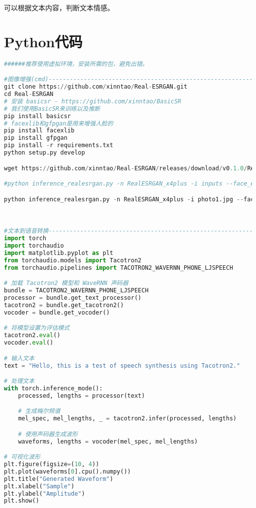 \documentclass{article}
\begin{document}
可以根据文本内容，判断文本情感。

\newpage
\section{Python代码}

\begin{lstlisting}[language=Python]
    ######推荐使用虚拟环境，安装所需的包，避免出错。

#图像增强(cmd)-------------------------------------------------------------------
git clone https://github.com/xinntao/Real-ESRGAN.git
cd Real-ESRGAN
# 安装 basicsr - https://github.com/xinntao/BasicSR
# 我们使用BasicSR来训练以及推断
pip install basicsr
# facexlib和gfpgan是用来增强人脸的
pip install facexlib
pip install gfpgan
pip install -r requirements.txt
python setup.py develop

wget https://github.com/xinntao/Real-ESRGAN/releases/download/v0.1.0/RealESRGAN_x4plus.pth -P weights

#python inference_realesrgan.py -n RealESRGAN_x4plus -i inputs --face_enhance

python inference_realesrgan.py -n RealESRGAN_x4plus -i photo1.jpg --face_enhance -o output_folder



#文本到语音转换-----------------------------------------------------------------
import torch
import torchaudio
import matplotlib.pyplot as plt
from torchaudio.models import Tacotron2
from torchaudio.pipelines import TACOTRON2_WAVERNN_PHONE_LJSPEECH

# 加载 Tacotron2 模型和 WaveRNN 声码器
bundle = TACOTRON2_WAVERNN_PHONE_LJSPEECH
processor = bundle.get_text_processor()
tacotron2 = bundle.get_tacotron2()
vocoder = bundle.get_vocoder()

# 将模型设置为评估模式
tacotron2.eval()
vocoder.eval()

# 输入文本
text = "Hello, this is a test of speech synthesis using Tacotron2."

# 处理文本
with torch.inference_mode():
    processed, lengths = processor(text)

    # 生成梅尔频谱
    mel_spec, mel_lengths, _ = tacotron2.infer(processed, lengths)

    # 使用声码器生成波形
    waveforms, lengths = vocoder(mel_spec, mel_lengths)

# 可视化波形
plt.figure(figsize=(10, 4))
plt.plot(waveforms[0].cpu().numpy())
plt.title("Generated Waveform")
plt.xlabel("Sample")
plt.ylabel("Amplitude")
plt.show()


\end{lstlisting}
\end{document}
